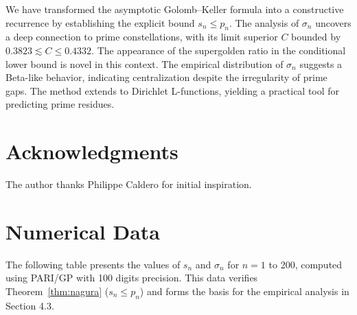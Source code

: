 \documentclass[12pt]{article}
\theoremstyle{plain}
\theoremstyle{definition}
\theoremstyle{remark}
\begin{document}
We have transformed the asymptotic Golomb--Keller formula into a constructive recurrence by establishing the explicit bound $s_n \leq p_n$. The analysis of $\sigma_n$ uncovers a deep connection to prime constellations, with its limit superior $C$ bounded by $0.3823 \lesssim C \leq 0.4332$. The appearance of the supergolden ratio in the conditional lower bound is novel in this context. The empirical distribution of $\sigma_n$ suggests a Beta-like behavior, indicating centralization despite the irregularity of prime gaps. The method extends to Dirichlet L-functions, yielding a practical tool for predicting prime residues.

\section*{Acknowledgments}

The author thanks Philippe Caldero for initial inspiration.

\appendix
\section{Numerical Data}

The following table presents the values of $s_n$ and $\sigma_n$ for $n=1$ to 200, computed using PARI/GP \cite{PARI2023} with 100 digits precision. This data verifies Theorem~\ref{thm:nagura} ($s_n \leq p_n$) and forms the basis for the empirical analysis in Section 4.3.
\end{document}
